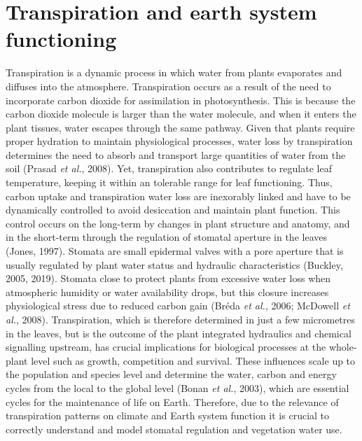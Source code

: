 \documentclass[11pt,twoside]{reedthesis}
\begin{document}
\newpage

\section{Transpiration and earth system
functioning}\label{transpiration-and-earth-system-functioning}

Transpiration is a dynamic process in which water from plants evaporates
and diffuses into the atmosphere. Transpiration occurs as a result of
the need to incorporate carbon dioxide for assimilation in
photosynthesis. This is because the carbon dioxide molecule is larger
than the water molecule, and when it enters the plant tissues, water
escapes through the same pathway. Given that plants require proper
hydration to maintain physiological processes, water loss by
transpiration determines the need to absorb and transport large
quantities of water from the soil (Prasad \emph{et al.}, 2008). Yet,
transpiration also contributes to regulate leaf temperature, keeping it
within an tolerable range for leaf functioning. Thus, carbon uptake and
transpiration water loss are inexorably linked and have to be
dynamically controlled to avoid desiccation and maintain plant function.
This control occurs on the long-term by changes in plant structure and
anatomy, and in the short-term through the regulation of stomatal
aperture in the leaves (Jones, 1997). Stomata are small epidermal valves
with a pore aperture that is usually regulated by plant water status and
hydraulic characteristics (Buckley, 2005, 2019). Stomata close to
protect plants from excessive water loss when atmospheric humidity or
water availability drops, but this closure increases physiological
stress due to reduced carbon gain (Bréda \emph{et al.}, 2006; McDowell
\emph{et al.}, 2008). Transpiration, which is therefore determined in
just a few micrometres in the leaves, but is the outcome of the plant
integrated hydraulics and chemical signalling upstream, has crucial
implications for biological processes at the whole-plant level such as
growth, competition and survival. These influences scale up to the
population and species level and determine the water, carbon and energy
cycles from the local to the global level (Bonan \emph{et al.}, 2003),
which are essential cycles for the maintenance of life on Earth.
Therefore, due to the relevance of transpiration patterns on climate and
Earth system function it is crucial to correctly understand and model
stomatal regulation and vegetation water use.\par
\end{document}
